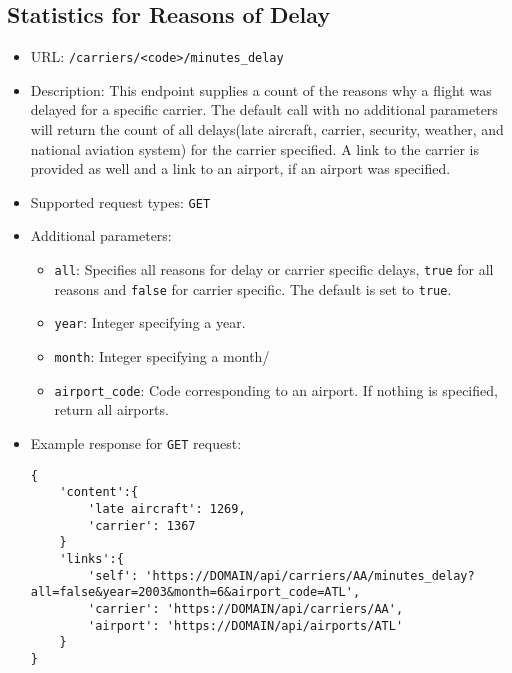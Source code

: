 \documentclass{article}
\begin{document}
    \subsection{Statistics for Reasons of Delay }
    \begin{itemize}
        \item URL: \texttt{/carriers/<code>/minutes\_delay}
    	\item Description: This endpoint supplies a count of the reasons why a flight was delayed for a specific carrier. The default call with no additional parameters will return the count of all delays(late aircraft, carrier, security, weather, and national aviation system) for the carrier specified. A link to the carrier is provided as well and a link to an airport, if an airport was specified.
        \item Supported request types: \texttt{GET}
        \item Additional parameters:
            \begin{itemize}
                \item \texttt{all}: Specifies all reasons for delay or carrier specific delays, \texttt{true} for all reasons and \texttt{false} for carrier specific. The default is set to \texttt{true}.
                \item \texttt{year}: Integer specifying a year.
                \item \texttt{month}: Integer specifying a month/
                \item \texttt{airport\_code}: Code corresponding to an airport. If nothing is specified, return all airports.
            \end{itemize}
        \item Example response for \texttt{GET} request:
        \begin{lstlisting}
{
    'content':{
        'late aircraft': 1269,
        'carrier': 1367
    }
    'links':{
        'self': 'https://DOMAIN/api/carriers/AA/minutes_delay?all=false&year=2003&month=6&airport_code=ATL',
        'carrier': 'https://DOMAIN/api/carriers/AA',
        'airport': 'https://DOMAIN/api/airports/ATL'
    }
}
       \end{lstlisting} 
    \end{itemize}
\end{document}
